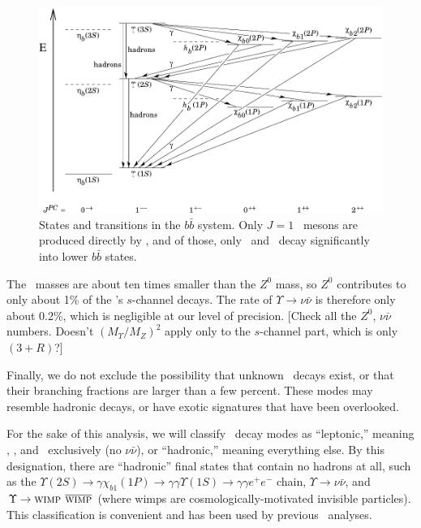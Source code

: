 \documentclass{cornell}
\begin{document}
\begin{figure}[p]
  \begin{center}
    \includegraphics[height=0.7\linewidth, angle=90]{plots/bbtransitions}
  \end{center}
  \caption{\label{bbtransitions} States and transitions in the
  $b\bar{b}$ system.  Only $J=1$ \ups\ mesons are produced directly by
  \ee, and of those, only \uss\ and \usss\ decay significantly into
  lower $b\bar{b}$ states.}
\end{figure}

The \ups\ masses are about ten times smaller than the $Z^0$ mass, so
$Z^0$ contributes to only about 1\% of the \ups's $s$-channel decays.
The rate of $\Upsilon \to \nu\bar{\nu}$ is therefore only about 0.2\%,
which is negligible at our level of precision.  [Check all the $Z^0$,
$\nu\bar{\nu}$ numbers.  Doesn't $(M_\Upsilon/M_Z)^2$ apply only to
the $s$-channel part, which is only $(3+R)$\bmm?]

Finally, we do not exclude the possibility that unknown \ups\ decays
exist, or that their branching fractions are larger than a few
percent.  These modes may resemble hadronic decays, or have exotic
signatures that have been overlooked.

For the sake of this analysis, we will classify \ups\ decay modes as
``leptonic,'' meaning \ee, \mumu, and \tautau\ exclusively (no
$\nu\bar{\nu}$), or ``hadronic,'' meaning everything else.  By this
designation, there are ``hadronic'' final states that contain no
hadrons at all, such as the $\Upsilon(2S) \to \gamma \chi_{b1}(1P) \to
\gamma\gamma \Upsilon(1S) \to \gamma\gamma e^+e^-$ chain, $\Upsilon
\to \nu\bar{\nu}$, and $\Upsilon \to \mbox{\sc wimp }
\overline{\mbox{\sc wimp}}$ (where {\sc wimp}s are
cosmologically-motivated invisible particles).  This classification is
convenient and has been used by previous \gee\ analyses.
\end{document}
